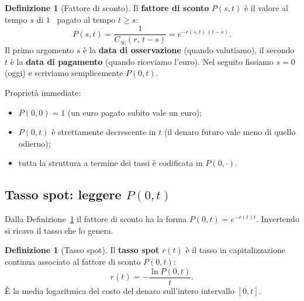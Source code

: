 \documentclass[11pt,a4paper]{article}
\theoremstyle{plain}
\theoremstyle{definition}
\newtheorem{definizione}[teorema]{Definizione}
\theoremstyle{remark}
\begin{document}
\begin{definizione}[Fattore di sconto]
\label{def:sconto}
Il \textbf{fattore di sconto} $P(s,t)$ \`e il valore al tempo $s$ di $1$~\texteuro{}
pagato al tempo $t \ge s$:
\[
  P(s,t) = \frac{1}{C_\infty(r,\,t-s)} = e^{-r(s,t)\,(t-s)}.
\]
Il primo argomento $s$ \`e la \textbf{data di osservazione} (quando valutiamo), il secondo
$t$ \`e la \textbf{data di pagamento} (quando riceviamo l'euro). Nel seguito fissiamo
$s = 0$ (oggi) e scriviamo semplicemente $P(0,t)$.

Propriet\`a immediate:
\begin{itemize}
  \item $P(0,0) = 1$ (un euro pagato subito vale un euro);
  \item $P(0,t)$ \`e strettamente decrescente in $t$ (il denaro futuro vale meno di quello odierno);
  \item tutta la struttura a termine dei tassi \`e codificata in $P(0,\cdot)$.
\end{itemize}
\end{definizione}

\subsection{Tasso spot: leggere $P(0,t)$}

Dalla Definizione~\ref{def:sconto} il fattore di sconto ha la forma $P(0,t)=e^{-r(t)t}$.
Invertendo si ricava il tasso che lo genera.

\begin{definizione}[Tasso spot]
\label{def:spot}
Il \textbf{tasso spot} $r(t)$ \`e il tasso in capitalizzazione continua associato al
fattore di sconto $P(0,t)$:
\begin{equation}
  r(t) = -\frac{\ln P(0,t)}{t}.
  \label{eq:spot-inv}
\end{equation}
\`E la media logaritmica del costo del denaro sull'intero intervallo $[0,t]$.
\end{definizione}

\end{document}
